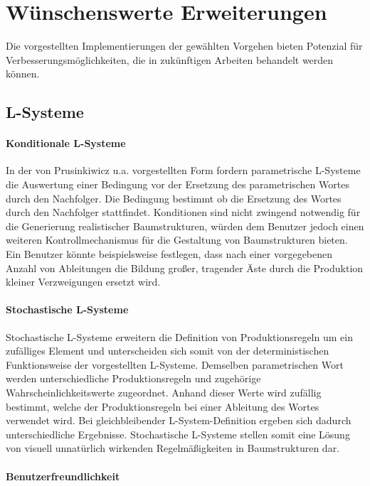 \section{Wünschenswerte Erweiterungen}

Die vorgestellten Implementierungen der gewählten Vorgehen bieten Potenzial für Verbesserungsmöglichkeiten, die in zukünftigen Arbeiten behandelt werden können.

\subsection{L-Systeme}

\paragraph{Konditionale L-Systeme}

In der von Prusinkiwicz u.a. vorgestellten Form fordern parametrische L-Systeme die Auswertung einer Bedingung vor der Ersetzung des parametrischen Wortes durch den Nachfolger. Die Bedingung bestimmt ob die Ersetzung des Wortes durch den Nachfolger stattfindet. Konditionen sind nicht zwingend notwendig für die Generierung realistischer Baumstrukturen, würden dem Benutzer jedoch einen weiteren Kontrollmechanismus für die Gestaltung von Baumstrukturen bieten. Ein Benutzer könnte beispielsweise festlegen, dass nach einer vorgegebenen Anzahl von Ableitungen die Bildung großer, tragender Äste durch die Produktion kleiner Verzweigungen ersetzt wird. \cite[S.41f]{ABOP:04}

\paragraph{Stochastische L-Systeme}

Stochastische L-Systeme erweitern die Definition von Produktionsregeln um ein zufälliges Element und unterscheiden sich somit von der deterministischen Funktionsweise der vorgestellten L-Systeme. Demselben parametrischen Wort werden unterschiedliche Produktionsregeln und zugehörige Wahrscheinlichkeitswerte zugeordnet. Anhand dieser Werte wird zufällig bestimmt, welche der Produktionsregeln bei einer Ableitung des Wortes verwendet wird. Bei gleichbleibender L-System-Definition ergeben sich dadurch unterschiedliche Ergebnisse. Stochastische L-Systeme stellen somit eine Lösung von visuell unnatürlich wirkenden Regelmäßigkeiten in Baumstrukturen dar. \cite[S.28]{ABOP:04}

\paragraph{Benutzerfreundlichkeit}

